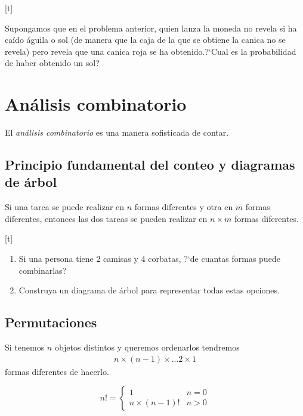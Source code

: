 [t]{}
 \begin{ejemplo}
  \label{solved:17}
	Supongamos que en el problema anterior, quien lanza la moneda no revela si ha caído águila o sol (de manera que la caja de la que se obtiene la canica no se revela) pero revela que una canica roja se ha obtenido.?`Cual es la probabilidad de haber obtenido un sol?
 \end{ejemplo}



\section{Análisis combinatorio}

{}
El \emph{análisis combinatorio} es una manera sofisticada de contar.


\subsection{Principio fundamental del conteo y diagramas de árbol}

Si una tarea se puede realizar en $n$ formas diferentes y otra en $m$ formas diferentes, entonces las dos tareas se pueden realizar en $n\times m$ formas diferentes.


[t]{}
\begin{ejemplo}
 \label{exmp:1.14}
\end{ejemplo}
 \begin{enumerate}
  \item Si una persona tiene 2 camisas y 4 corbatas, ?`de cuantas formas puede combinarlas?
  \item Construya un diagrama de árbol para representar todas estas opciones.
 \end{enumerate}



\subsection{Permutaciones}
{}
Si tenemos $n$ objetos distintos y queremos ordenarlos tendremos
\begin{align*}
n \times (n-1) \times ... 2\times 1
\end{align*} formas diferentes de hacerlo.

{}
\begin{defn}[$n$ factorial]
 \begin{equation}
n! = \begin{cases}
     1 & n=0 \\
     n\times(n-1)! & n>0
    \end{cases}
\end{equation}

\end{defn}


